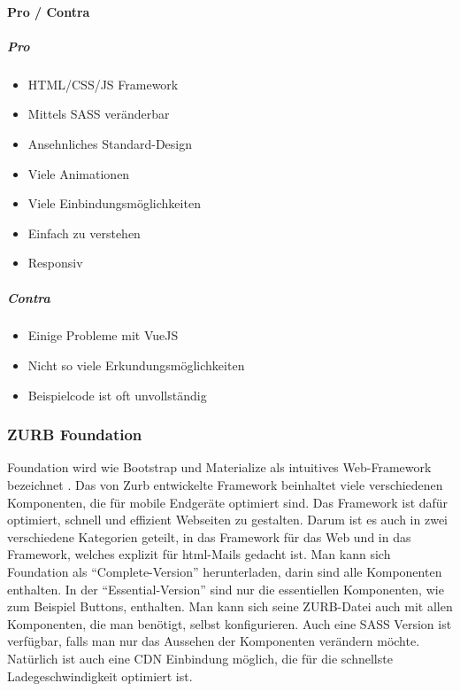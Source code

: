 		\paragraph{Pro / Contra}
		\subparagraph{Pro}
		\begin{itemize}
			\item HTML/CSS/JS Framework
			\item Mittels SASS veränderbar
			\item Ansehnliches Standard-Design 
			\item Viele Animationen
			\item Viele Einbindungsmöglichkeiten
			\item Einfach zu verstehen
			\item Responsiv
		\end{itemize}
		\subparagraph{Contra}
		\begin{itemize}
			\item Einige Probleme mit VueJS
			\item Nicht so viele Erkundungsmöglichkeiten
			\item Beispielcode ist oft unvollständig
		\end{itemize}
	
		\subsubsection{ZURB Foundation}
		Foundation wird wie Bootstrap und Materialize als intuitives Web-Framework bezeichnet \cite{foundation-intro}. Das von Zurb entwickelte Framework beinhaltet viele verschiedenen Komponenten, die für mobile Endgeräte optimiert sind. Das Framework ist dafür optimiert, schnell und effizient Webseiten zu gestalten. Darum ist es auch in zwei verschiedene Kategorien geteilt, in das Framework für das Web und in das Framework, welches explizit für html-Mails gedacht ist. Man kann sich Foundation als \enquote{Complete-Version} herunterladen, darin sind alle Komponenten enthalten. In der \enquote{Essential-Version} sind nur die essentiellen Komponenten, wie zum Beispiel Buttons, enthalten. Man kann sich seine ZURB-Datei auch mit allen Komponenten, die man benötigt, selbst konfigurieren. Auch eine SASS Version ist verfügbar, falls man nur das Aussehen der Komponenten verändern möchte. Natürlich ist auch eine CDN Einbindung möglich, die für die schnellste Ladegeschwindigkeit optimiert ist.
